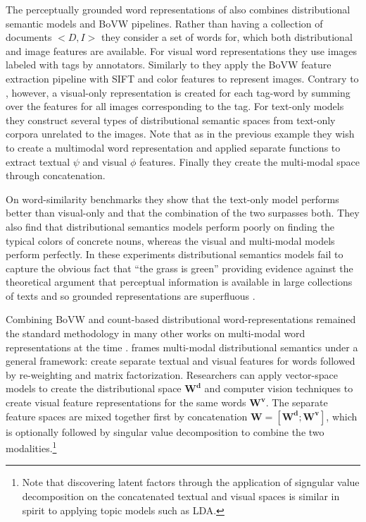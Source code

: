 The perceptually grounded word representations of \cite{bruni2012distributional}
also combines distributional semantic models and BoVW pipelines.
Rather than having a collection of documents $<D, I>$ they consider a set of words for, which
both distributional and image features are available. For visual word representations
they use images labeled with tags by annotators. Similarly to \cite{feng2010visual} they
apply the BoVW feature extraction pipeline with SIFT and color features to
represent images. Contrary to \cite{feng2010visual}, however,
a visual-only representation is created for each tag-word by summing over the features
for all images corresponding to the tag.
For text-only models they construct several types of distributional semantic spaces
from text-only corpora unrelated to the images.
Note that as in the previous example they wish to create a multimodal
word representation and applied separate functions to extract textual $\psi$ and visual
$\phi$ features. Finally they create the multi-modal space through concatenation.

On word-similarity benchmarks they show that the text-only model performs better than visual-only
and that the combination of the two surpasses both.
They also find that distributional semantics
models perform poorly on finding the typical colors of concrete nouns,
whereas the visual and multi-modal models perform perfectly. In these experiments
distributional semantics models fail to capture the obvious fact that ``the grass is green''
providing evidence against the theoretical argument that perceptual information is available in
large collections of texts and so grounded representations are superfluous \citep{louwerse2011symbol}.


Combining BoVW and count-based distributional word-representations remained the standard methodology
in many other works on multi-modal word representations at the time
\citep{bruni2011distributional,leong2011going,leong2011measuring}.
\cite{bruni2014multimodal} frames multi-modal distributional semantics under a general framework: 
create separate textual and visual features for words followed by
re-weighting and matrix factorization. Researchers can apply vector-space
models to create the distributional space $\mathbf{W^d}$ and computer vision techniques to create
visual feature representations for the same words $\mathbf{W^v}$. The separate feature spaces
are mixed together  first  by concatenation $\mathbf{W} = [\mathbf{W^d};\mathbf{W^v}]$, which is
optionally followed by singular value decomposition
to combine the two modalities.\footnote{Note that discovering latent factors through the application
of signgular value decomposition on the concatenated textual and visual spaces is similar in spirit
to applying topic models such as LDA.} 

